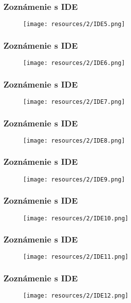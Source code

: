 \documentclass[serif,mathserif]{beamer}
\begin{document}
\begin{frame}
  \frametitle{Zoznámenie s IDE}
 \begin{figure}[h]
	\texttt{[image: resources/2/IDE5.png]}
  \end{figure}
\end{frame}

\begin{frame}
  \frametitle{Zoznámenie s IDE}
 \begin{figure}[h]
	\texttt{[image: resources/2/IDE6.png]}
  \end{figure}
\end{frame}

\begin{frame}
  \frametitle{Zoznámenie s IDE}
 \begin{figure}[h]
	\texttt{[image: resources/2/IDE7.png]}
  \end{figure}
\end{frame}

\begin{frame}
  \frametitle{Zoznámenie s IDE}
 \begin{figure}[h]
	\texttt{[image: resources/2/IDE8.png]}
  \end{figure}
\end{frame}

\begin{frame}
  \frametitle{Zoznámenie s IDE}
 \begin{figure}[h]
	\texttt{[image: resources/2/IDE9.png]}
  \end{figure}
\end{frame}

\begin{frame}
  \frametitle{Zoznámenie s IDE}
 \begin{figure}[h]
	\texttt{[image: resources/2/IDE10.png]}
  \end{figure}
\end{frame}

\begin{frame}
  \frametitle{Zoznámenie s IDE}
 \begin{figure}[h]
	\texttt{[image: resources/2/IDE11.png]}
  \end{figure}
\end{frame}

\begin{frame}
  \frametitle{Zoznámenie s IDE}
 \begin{figure}[h]
	\texttt{[image: resources/2/IDE12.png]}
  \end{figure}
\end{frame}
\end{document}
